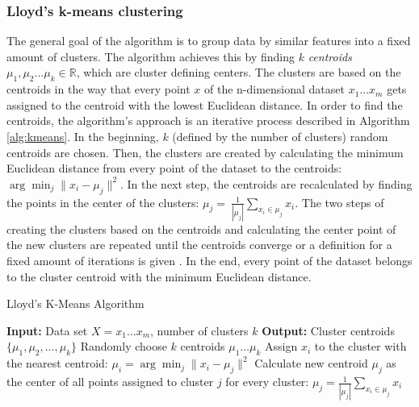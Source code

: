 \documentclass[
    fontsize=12pt,
    headings=small,
    parskip=half,           %
    bibliography=totoc,
    numbers=noenddot,       %
    open=any,               %
    ]{scrreprt}
\begin{document}
\subsubsection{Lloyd's k-means clustering}
The general goal of the algorithm is to group data by similar features into a fixed amount of clusters. The algorithm achieves this by finding $k$ \emph{centroids} $\mu_1, \mu_2 ... \mu_k \in \mathbb{R}$, which are cluster defining centers. The clusters are based on the centroids in the way that every point $x$ of the n-dimensional dataset ${x_1 ... x_m}$ gets assigned to the centroid with the lowest Euclidean distance. In order to find the centroids, the algorithm's approach is an iterative process described in Algorithm \ref{alg:kmeans}. In the beginning, $k$ (defined by the number of clusters) random centroids are chosen. Then, the clusters are created by calculating the minimum Euclidean distance from every point of the dataset to the centroids: $\arg\min_j \|x_i - \mu_j\|^2$. In the next step, the centroids are recalculated by finding the points in the center of the clusters: $\mu_j = \ \frac {1}{|\mu_j|} \sum_{x_i \in \mu_j} x_i$. The two steps of creating the clusters based on the centroids and calculating the center point of the new clusters are repeated until the centroids converge or a definition for a fixed amount of iterations is given \cite{piech2013kmeans} \cite{lloyd1982kmeans}. In the end, every point of the dataset belongs to the cluster centroid with the minimum Euclidean distance.


\begin{algorithm}
	\caption{Lloyd's K-Means Algorithm}
	\label{alg:kmeans}
	\begin{algorithmic}
		\State \textbf{Input:} Data set $X = {x_1 \ldots x_m}$, number of clusters $k$
		\State \textbf{Output:} Cluster centroids $\{\mu_1, \mu_2, \ldots, \mu_k\}$
		\State Randomly choose $k$ centroids ${\mu_1 \ldots \mu_k}$ 
		\Repeat
			\State Assign $x_i$ to the cluster with the nearest centroid: $\mu_i = \arg\min_j \|x_i - \mu_j\|^2$
		\EndFor
			\State Calculate new centroid $\mu_j$ as the center of all points assigned to cluster $j$ for every cluster: $\mu_j = \frac{1}{|\mu_j|} \sum_{x_i \in \mu_j} x_i$
		\EndFor
	\end{algorithmic}
\end{algorithm}
\end{document}
